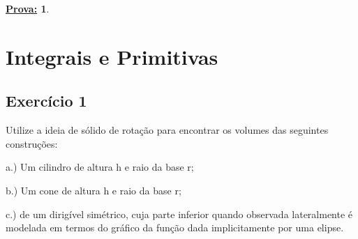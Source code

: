 \documentclass{article}
\newtheorem*{proof*}{\underline{Prova:}}
\begin{document}
\begin{proof*}

\end{proof*}

\section{Integrais e Primitivas}
\subsection{Exerc\'icio 1} Utilize a ideia de s\'olido de rota\c c\~ao para encontrar os volumes das
seguintes constru\c c\~oes:

a.) Um cilindro de altura h e raio da base r;

b.) Um cone de altura h e raio da base r;

c.) de um dirig\'ivel sim\'etrico, cuja parte inferior quando observada lateralmente \'e modelada
em termos do gr\'afico da fun\c c\~ao dada implicitamente por uma elipse.
\end{document}
